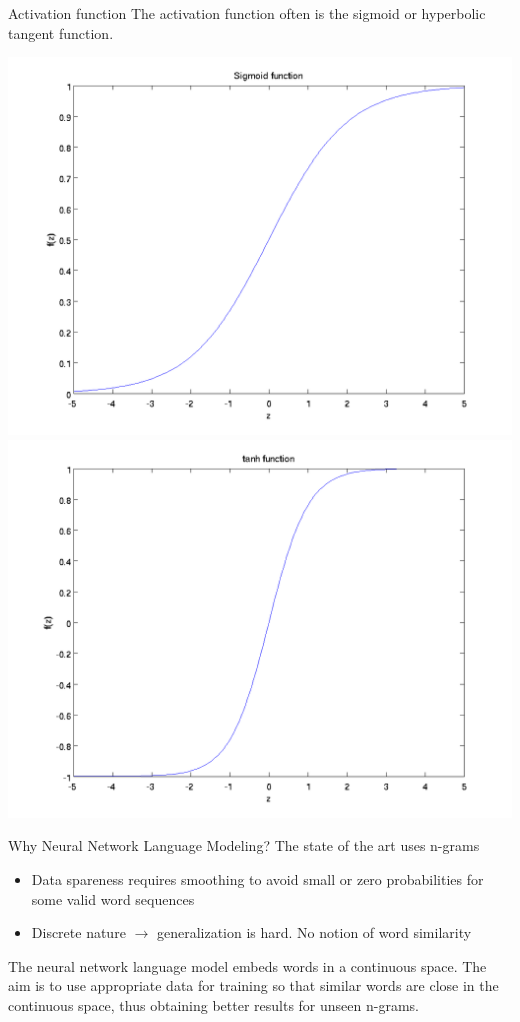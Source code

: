 \documentclass{beamer}
\begin{document}
\begin{frame}{Activation function}
	The activation function often is the sigmoid or hyperbolic tangent function.
	\begin{center}
		\includegraphics[scale=0.28]{images/sigmoid.png}
		\includegraphics[scale=0.28]{images/tanh.png}
	\end{center}
\end{frame}

\begin{frame}{Why Neural Network Language Modeling?}
	The state of the art uses n-grams
	\begin{itemize}
		\item Data spareness requires smoothing to avoid small or zero probabilities for some valid word sequences
		\item Discrete nature $\rightarrow$ generalization is hard. No notion of word similarity
	\end{itemize}
	\vspace{5mm}
	The neural network language model embeds words in a continuous space. The aim is to use appropriate data for training so that similar words are close in the continuous space, thus obtaining better results for unseen n-grams.
\end{frame}
\end{document}
